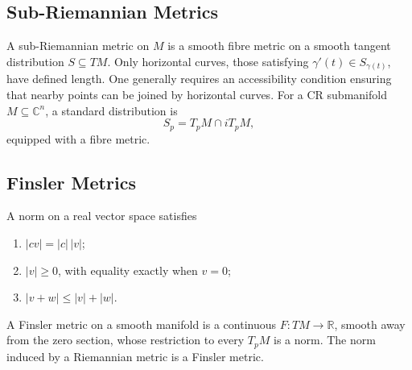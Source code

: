 \subsection{Sub-Riemannian Metrics}

A sub-Riemannian metric on $M$ is a smooth fibre metric on a smooth tangent distribution $S\subseteq TM$. Only horizontal curves, those satisfying $\gamma'(t)\in S_{\gamma(t)}$, have defined length. One generally requires an accessibility condition ensuring that nearby points can be joined by horizontal curves. For a CR submanifold $M\subseteq\mathbb C^n$, a standard distribution is
\[
S_p=T_pM\cap iT_pM,
\]
equipped with a fibre metric.

\subsection{Finsler Metrics}

A norm on a real vector space satisfies
\begin{enumerate}
\item $|cv|=|c|\,|v|$;
\item $|v|\ge0$, with equality exactly when $v=0$;
\item $|v+w|\le|v|+|w|$.
\end{enumerate}
A Finsler metric on a smooth manifold is a continuous $F:TM\to\mathbb R$, smooth away from the zero section, whose restriction to every $T_pM$ is a norm. The norm induced by a Riemannian metric is a Finsler metric.

